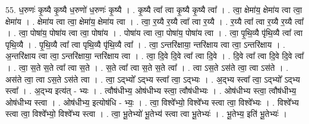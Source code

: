 \documentclass[17pt]{extarticle}
\begin{document}
55. ध॒रुणः॑ कृ॒ष्यै कृ॒ष्यै ध॒रुणो॑ ध॒रुणः॑ कृ॒ष्यै । . कृ॒ष्यै त्वा᳚ त्वा कृ॒ष्यै कृ॒ष्यै त्वा᳚ । . त्वा॒ क्षेमा॑य॒ क्षेमा॑य त्वा त्वा॒ क्षेमा॑य । . क्षेमा॑य त्वा त्वा॒ क्षेमा॑य॒ क्षेमा॑य त्वा । . त्वा॒ र॒य्यै र॒य्यै त्वा᳚ त्वा र॒य्यै । . र॒य्यै त्वा᳚ त्वा र॒य्यै र॒य्यै त्वा᳚ । . त्वा॒ पोषा॑य॒ पोषा॑य त्वा त्वा॒ पोषा॑य । . पोषा॑य त्वा त्वा॒ पोषा॑य॒ पोषा॑य त्वा । . त्वा॒ पृ॒थि॒व्यै पृ॑थि॒व्यै त्वा᳚ त्वा पृथि॒व्यै । . पृ॒थि॒व्यै त्वा᳚ त्वा पृथि॒व्यै पृ॑थि॒व्यै त्वा᳚ । . त्वा॒ ऽन्तरि॑क्षाया॒ न्तरि॑क्षाय त्वा त्वा॒ ऽन्तरि॑क्षाय । . अ॒न्तरि॑क्षाय त्वा त्वा॒ ऽन्तरि॑क्षाया॒ न्तरि॑क्षाय त्वा । . त्वा॒ दि॒वे दि॒वे त्वा᳚ त्वा दि॒वे । . दि॒वे त्वा᳚ त्वा दि॒वे दि॒वे त्वा᳚ । . त्वा॒ स॒ते स॒ते त्वा᳚ त्वा स॒ते । . स॒ते त्वा᳚ त्वा स॒ते स॒ते त्वा᳚ । . त्वा ऽस॒ते ऽस॑ते त्वा॒ त्वा ऽस॑ते । . अस॑ते त्वा॒ त्वा ऽस॒ते ऽस॑ते त्वा । . त्वा॒ ऽद्भ्यो᳚ ऽद्भ्य स्त्वा᳚ त्वा॒ ऽद्भ्यः । . अ॒द्भ्य स्त्वा᳚ त्वा॒ ऽद्भ्यो᳚ ऽद्भ्य स्त्वा᳚ । . अ॒द्भ्य इत्य॑त् - भ्यः । . त्वौष॑धीभ्य॒ ओष॑धीभ्य स्त्वा॒ त्वौष॑धीभ्यः । . ओष॑धीभ्य स्त्वा॒ त्वौष॑धीभ्य॒ ओष॑धीभ्य स्त्वा । . ओष॑धीभ्य॒ इत्योष॑धि - भ्यः॒ । . त्वा॒ विश्वे᳚भ्यो॒ विश्वे᳚भ्य स्त्वा त्वा॒ विश्वे᳚भ्यः । . विश्वे᳚भ्य स्त्वा त्वा॒ विश्वे᳚भ्यो॒ विश्वे᳚भ्य स्त्वा । . त्वा॒ भू॒तेभ्यो॑ भू॒तेभ्य॑ स्त्वा त्वा भू॒तेभ्यः॑ । . भू॒तेभ्य॒ इति॑ भू॒तेभ्यः॑ । \newline
\end{document}
